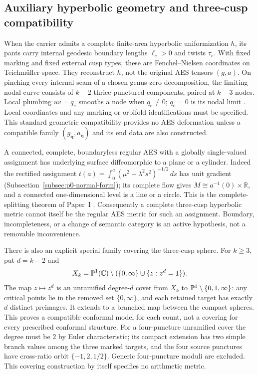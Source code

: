 \subsection{Auxiliary hyperbolic geometry and three-cusp compatibility}

When the carrier admits a complete finite-area hyperbolic uniformization $h$,
its pants carry internal geodesic boundary lengths $\ell_e>0$ and twists
$\tau_e$.  With fixed marking and fixed external cusp types, these are
Fenchel--Nielsen coordinates on Teichm\"uller space.  They reconstruct $h$,
not the original AES tensors $(g,a)$.  On pinching every internal seam of a
chosen genus-zero decomposition, the limiting nodal curve consists of
$k-2$ thrice-punctured components, paired at $k-3$ nodes.  Local plumbing
$uv=q_e$ smooths a node when $q_e\ne0$; $q_e=0$ is its nodal limit
\cite[\S3]{Wolpert2003Completion}.  Local coordinates and any marking or
orbifold identifications must be specified.  This standard geometric
compatibility provides no AES deformation unless a compatible family
$(g_{\mathbf q},a_{\mathbf q})$ and its end data are also constructed.

\begin{warning}
\label{warn:p0-hyperbolic-auxiliary}
A connected, complete, boundaryless regular AES with a globally single-valued
assignment has underlying surface diffeomorphic to a plane or a cylinder.
Indeed the rectified assignment
$t(a)=\int_0^a(\mu^2+\lambda^2s^2)^{-1/2}\,ds$ has unit gradient
(Subsection~\ref{subsec:p0-normal-form}); its complete
flow gives $M\cong a^{-1}(0)\times\mathbb R$, and a connected one-dimensional
level is a line or a circle.  This is the complete-splitting theorem of
Paper~I \cite{Yuan2026AEGFoundations}.  Consequently a complete three-cusp
hyperbolic metric cannot itself be the regular AES metric for such an
assignment.  Boundary, incompleteness, or a change of semantic category is an
active hypothesis, not a removable inconvenience.
\end{warning}

There is also an explicit special family covering the three-cusp sphere.
For $k\ge3$, put $d=k-2$ and
\[
 X_k=\mathbb{P}^1(\mathbb{C})\setminus(\{0,\infty\}\cup\{z:z^d=1\}).
\]
The map $z\mapsto z^d$ is an unramified degree-$d$ cover from $X_k$ to
$\mathbb{P}^1\setminus\{0,1,\infty\}$: any critical points lie in the removed set
$\{0,\infty\}$, and each retained target has exactly $d$ distinct preimages.
It extends to a branched map between the compact spheres.  This proves a
compatible conformal model for each count, not a covering for every prescribed
conformal structure.  For a four-puncture unramified cover the degree must be
$2$ by Euler characteristic; its compact extension has two simple branch
values among the three marked targets, and the four source punctures have
cross-ratio orbit $\{-1,2,1/2\}$.  Generic four-puncture moduli are excluded.
This covering construction by itself specifies no arithmetic metric.

